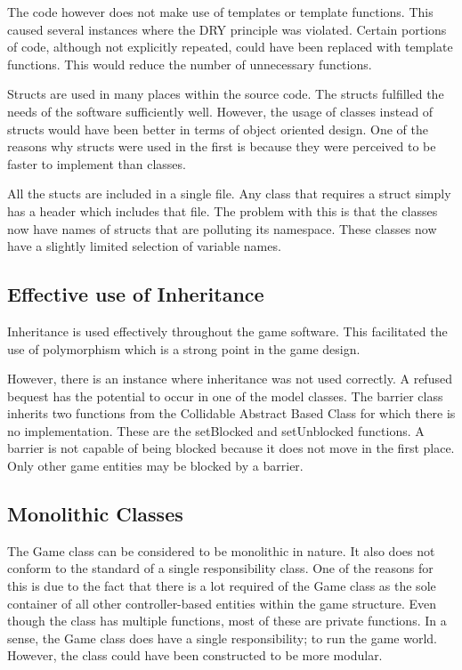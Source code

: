 \documentclass[10pt,twocolumn]{witseiepaper}
\begin{document}
The code however does not make use of templates or template functions. This caused several instances where the DRY principle was violated. Certain portions of code, although not explicitly repeated, could have been replaced with template functions. This would reduce the number of unnecessary functions.

Structs are used in many places within the source code. The structs fulfilled the needs of the software sufficiently well. However, the usage of classes instead of structs would have been better in terms of object oriented design. One of the reasons why structs were used in the first is because they were perceived to be faster to implement than classes.

All the stucts are included in a single file. Any class that requires a struct simply has a header which includes that file. The problem with this is that the classes now have names of structs that are polluting its namespace. These classes now have a slightly limited selection of variable names.

\subsection{Effective use of Inheritance}
Inheritance is used effectively throughout the game software. This facilitated the use of polymorphism which is a strong point in the game design.

However, there is an instance where inheritance was not used correctly. A refused bequest has the potential to occur in one of the model classes. The barrier class inherits two functions from the Collidable Abstract Based Class for which there is no implementation. These are the setBlocked and setUnblocked functions. A barrier is not capable of being blocked because it does not move in the first place. Only other game entities may be blocked by a barrier.

\subsection{Monolithic Classes}
The Game class can be considered to be monolithic in nature. It also does not conform to the standard of a single responsibility class. One of the reasons for this is due to the fact that there is a lot required of the Game class as the sole container of all other controller-based entities within the game structure. Even though the class has multiple functions, most of these are private functions. In a sense, the Game class does have a single responsibility; to run the game world. However, the class could have been constructed to be more modular. 
\end{document}
